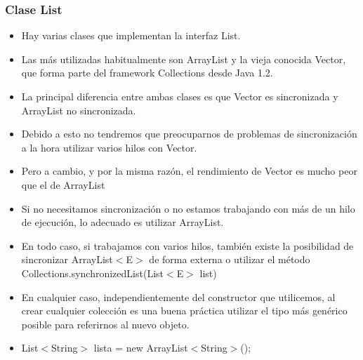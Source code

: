\documentclass{beamer}
\begin{document}
\begin{frame}
\frametitle{Clase List}
\begin{footnotesize}
\begin{itemize}[<+->]
\item Hay varias clases que implementan la interfaz List.
\item  Las más utilizadas habitualmente son ArrayList y la vieja conocida Vector, que forma parte del framework Collections desde Java 1.2.
\item La principal diferencia entre ambas clases es que Vector es sincronizada y ArrayList no sincronizada.
\item Debido a esto no tendremos que preocuparnos de problemas de sincronización a la hora utilizar varios hilos con Vector.
\item Pero a cambio, y por la misma razón, el rendimiento de Vector es mucho peor que el de ArrayList
\item Si no necesitamos sincronización o no estamos trabajando con más de un hilo de ejecución, lo adecuado es utilizar ArrayList.
\item En todo caso, si trabajamos con varios hilos, también existe la posibilidad de sincronizar ArrayList$<$E$>$ de forma externa o utilizar el método Collections.synchronizedList(List$<$E$>$ list)
\item En cualquier caso, independientemente del constructor que utilicemos, al crear cualquier colección es una buena práctica utilizar el tipo más genérico posible para referirnos al nuevo objeto.
\item List$<$String$>$ lista = new ArrayList$<$String$>$();
\end{itemize}
\end{footnotesize}
\end{frame}
\end{document}
